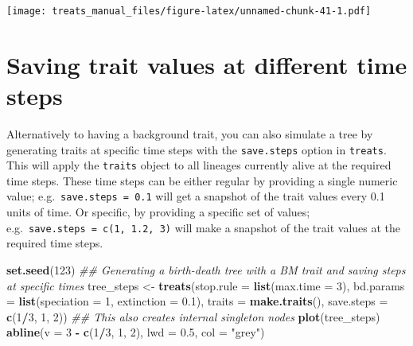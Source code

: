 \documentclass[
]{book}
\newenvironment{Shaded}{\begin{snugshade}}{\end{snugshade}}
\newcommand{\CommentTok}[1]{\textcolor[rgb]{0.56,0.35,0.01}{\textit{#1}}}
\newcommand{\DataTypeTok}[1]{\textcolor[rgb]{0.13,0.29,0.53}{#1}}
\newcommand{\DecValTok}[1]{\textcolor[rgb]{0.00,0.00,0.81}{#1}}
\newcommand{\FloatTok}[1]{\textcolor[rgb]{0.00,0.00,0.81}{#1}}
\newcommand{\KeywordTok}[1]{\textcolor[rgb]{0.13,0.29,0.53}{\textbf{#1}}}
\newcommand{\NormalTok}[1]{#1}
\newcommand{\OperatorTok}[1]{\textcolor[rgb]{0.81,0.36,0.00}{\textbf{#1}}}
\newcommand{\StringTok}[1]{\textcolor[rgb]{0.31,0.60,0.02}{#1}}
\begin{document}
\texttt{[image: treats\_manual\_files/figure-latex/unnamed-chunk-41-1.pdf]}

\hypertarget{saving-trait-values-at-different-time-steps}{%
\section{Saving trait values at different time steps}\label{saving-trait-values-at-different-time-steps}}

Alternatively to having a background trait, you can also simulate a tree by generating traits at specific time steps with the \texttt{save.steps} option in \texttt{treats}.
This will apply the \texttt{traits} object to all lineages currently alive at the required time steps.
These time steps can be either regular by providing a single numeric value; e.g.~\texttt{save.steps\ =\ 0.1} will get a snapshot of the trait values every 0.1 units of time.
Or specific, by providing a specific set of values; e.g.~\texttt{save.steps\ =\ c(1,\ 1.2,\ 3)} will make a snapshot of the trait values at the required time steps.

\begin{Shaded}
\begin{Highlighting}[]
\KeywordTok{set.seed}\NormalTok{(}\DecValTok{123}\NormalTok{)}
\CommentTok{\#\# Generating a birth{-}death tree with a BM trait and saving steps at specific times}
\NormalTok{tree\_steps \textless{}{-}}\StringTok{ }\KeywordTok{treats}\NormalTok{(}\DataTypeTok{stop.rule  =} \KeywordTok{list}\NormalTok{(}\DataTypeTok{max.time =} \DecValTok{3}\NormalTok{),}
                   \DataTypeTok{bd.params  =} \KeywordTok{list}\NormalTok{(}\DataTypeTok{speciation =} \DecValTok{1}\NormalTok{, }\DataTypeTok{extinction =} \FloatTok{0.1}\NormalTok{),}
                   \DataTypeTok{traits     =} \KeywordTok{make.traits}\NormalTok{(),}
                   \DataTypeTok{save.steps =} \KeywordTok{c}\NormalTok{(}\DecValTok{1}\OperatorTok{/}\DecValTok{3}\NormalTok{, }\DecValTok{1}\NormalTok{, }\DecValTok{2}\NormalTok{))}
\CommentTok{\#\# This also creates internal singleton nodes}
\KeywordTok{plot}\NormalTok{(tree\_steps)}
\KeywordTok{abline}\NormalTok{(}\DataTypeTok{v =} \DecValTok{3} \OperatorTok{{-}}\StringTok{ }\KeywordTok{c}\NormalTok{(}\DecValTok{1}\OperatorTok{/}\DecValTok{3}\NormalTok{, }\DecValTok{1}\NormalTok{, }\DecValTok{2}\NormalTok{), }\DataTypeTok{lwd =} \FloatTok{0.5}\NormalTok{, }\DataTypeTok{col =} \StringTok{"grey"}\NormalTok{)}
\end{Highlighting}
\end{Shaded}
\end{document}
